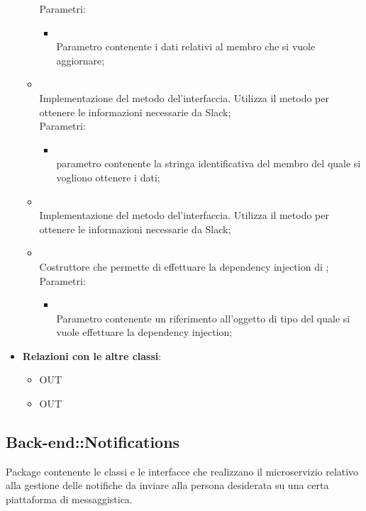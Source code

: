 \begin{itemize}
\begin{itemize}
		Parametri:
		\begin{itemize}
			\item {} \\
			Parametro contenente i dati relativi al membro che si vuole aggiornare;
		\end{itemize}
		\item[]  \\
		Implementazione del metodo del'interfaccia. Utilizza il metodo  per ottenere le informazioni necessarie da Slack;\\
		Parametri:
		\begin{itemize}
			\item {} \\
			parametro contenente la stringa identificativa del membro del quale si vogliono ottenere i dati;
		\end{itemize}
		\item[]  \\
		Implementazione del metodo del'interfaccia. Utilizza il metodo  per ottenere le informazioni necessarie da Slack;\\
		\item[]  \\
		Costruttore che permette di effettuare la dependency injection di ;\\
		Parametri:
		\begin{itemize}
			\item {} \\
			Parametro contenente un riferimento all'oggetto di tipo  del quale si vuole effettuare la dependency injection;
		\end{itemize}
	\end{itemize}
	\item \textbf{Relazioni con le altre classi}:
	\begin{itemize}
		\item OUT \hyperlink{Member_label}{}
		\item OUT \hyperlink{ErrorObservable_label}{}
	\end{itemize}
\end{itemize}
\FloatBarrier

\subsection{Back-end::Notifications}
Package contenente le classi e le interfacce che realizzano il microservizio relativo alla gestione delle notifiche da inviare alla persona desiderata su una certa piattaforma di messaggistica.\\



